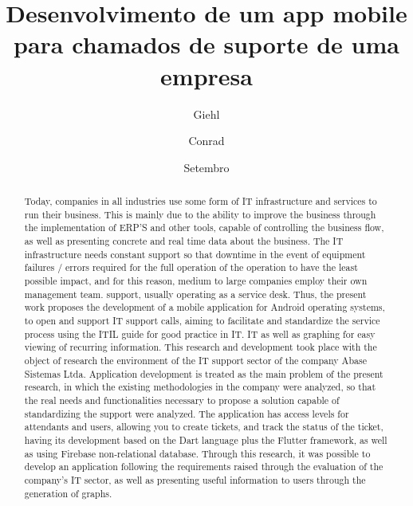\documentclass[diss]{template/setrem}
\title{Desenvolvimento de um app mobile para chamados de suporte de uma empresa}
\author{Giehl}{Bruno Leonardo}
\author{Conrad}{Mateus Augusto}
\date{Setembro}{2019}
\begin{document}
 
\maketitle
%
\begin{abstract}

Today, companies in all industries use some form of IT infrastructure and services to run their business. This is mainly due to the ability to improve the business through the implementation of ERP'S and other tools, capable of controlling the business flow, as well as presenting concrete and real time data about the business. The IT infrastructure needs constant support so that downtime in the event of equipment failures / errors required for the full operation of the operation to have the least possible impact, and for this reason, medium to large companies employ their own management team. support, usually operating as a service desk. Thus, the present work proposes the development of a mobile application for Android operating systems, to open and support IT support calls, aiming to facilitate and standardize the service process using the ITIL guide for good practice in IT. IT as well as graphing for easy viewing of recurring information. This research and development took place with the object of research the environment of the IT support sector of the company Abase Sistemas Ltda. Application development is treated as the main problem of the present research, in which the existing methodologies in the company were analyzed, so that the real needs and functionalities necessary to propose a solution capable of standardizing the support were analyzed. The application has access levels for attendants and users, allowing you to create tickets, and track the status of the ticket, having its development based on the Dart language plus the Flutter framework, as well as using Firebase non-relational database. Through this research, it was possible to develop an application following the requirements raised through the evaluation of the company's IT sector, as well as presenting useful information to users through the generation of graphs. 
\end{abstract}
\end{document}
